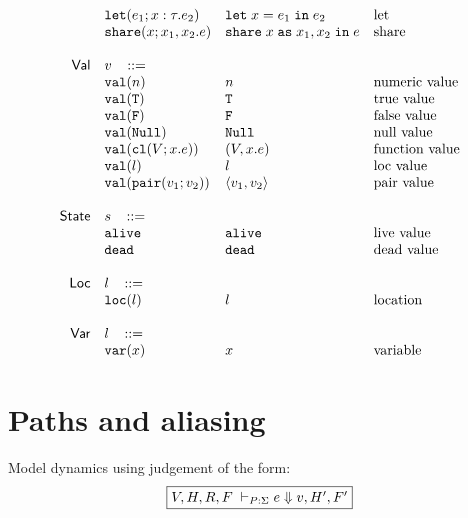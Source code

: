 \documentclass[sigconf]{acmart}
\newcommand{\ms}[1]{\ensuremath{\mathsf{#1}}}
\newcommand{\irl}[1]{\mathtt{#1}}
\newcommand{\sharecst}[4]{\irl{share}\;#1\;\irl{as}\;#2,#3\;\irl{in}\;#4}
\newcommand{\shareabt}[4]{\irl{share}(#1;#2,#3.#4)}
\theoremstyle{definition}
\begin{document}
\begin{table}
\[\begin{array}{r l l l l}
  & \irl{let}(e_1; x : \tau.e_2)			& \irl{let}\; x = e_1 \; \irl{in}\; e_2   	& \text{let}\\
  & \shareabt{x}{x_1}{x_2}{e} &\sharecst{x}{x_1}{x_2}{e} &\text{share}\\
  \\
\ms{Val}
        & v   \,\,\,\,\, ::= \\
 	& \irl{val}(n)                                			& n 												& \text{numeric value}\\
 	& \irl{val}(\irl{T})                               			& \irl{T} 								  & \text{true value}\\
 	& \irl{val}(\irl{F})                                			& \irl{F}								  & \text{false value}\\
 	& \irl{val}(\irl{Null})                                  & \irl{Null} 								  & \text{null value}\\
 	& \irl{val}(\irl{cl}(V; x.e))                & (V, x.e) 					& \text{function value}\\
 	& \irl{val}(l)                                			& l 								  & \text{loc value}\\
 	& \irl{val}(\pairexabt{v_1}{v_2})                             & \pairexcst{v_1}{v_2} 								  & \text{pair value}\\
  \\
\ms{State} & s   \,\,\,\,\, ::= \\
 	& \irl{alive}                                			& \irl{alive} 												& \text{live value}\\
 	& \irl{dead}                                			& \irl{dead} 												& \text{dead value}\\\\
\ms{Loc} & l   \,\,\,\,\, ::= \\
 	& \irl{loc}(l)                                			& l 												& \text{location}\\\\
\ms{Var} & l   \,\,\,\,\, ::= \\
 	& \irl{var}(x)                                			& x 												& \text{variable}\\
\end{array}
\]
\end{table}

\section{Paths and aliasing}

Model dynamics using judgement of the form:
\[
\fbox{$V,H,R,F \; \vdash_{P : \Sigma} e \Downarrow v, H', F'$}
\]
\end{document}
